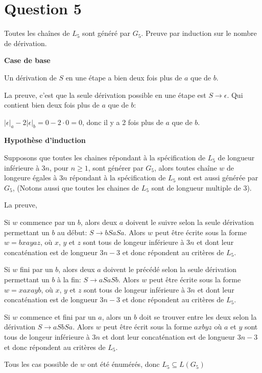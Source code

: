 \documentclass[class=article]{standalone}
\begin{document}
\section*{Question 5}

Toutes les chaînes de $L_5$ sont généré par $G_5$. Preuve par induction sur le nombre de dérivation.

{\bf Case de base}

Un dérivation de $S$ en une étape a bien deux fois plus de $a$ que de $b$. 

La preuve, c'est que la seule dérivation possible en une 
étape est $S \rightarrow \epsilon$. Qui contient bien deux fois 
plus de $a$ que de $b$: 

$|\epsilon|_a - 2|\epsilon|_b = 0 - 2\cdot0 = 0$,
donc il y a 2 fois plus de $a$ que de $b$.

{\bf Hypothèse d'induction}

Supposons que toutes les chaines répondant à la spécification de $L_5$
de longueur inférieure à $3n$, pour $n \geq 1$, sont générer par $G_5$,
alors toutes chaîne $w$ de longeure égales à $3n$ répondant à la spécification de $L_5$
sont est aussi générée par $G_5$, 
(Notons aussi que toutes les chaines de $L_5$ 
sont de longueur multiple de 3). 

La preuve, 

Si $w$ commence par un $b$, alors deux $a$ doivent 
le suivre selon la seule dérivation permettant un $b$ au début: $S \rightarrow bSaSa$.
Alors $w$ peut être écrite sous la forme 
$w = bxayaz$, où $x$, $y$ et $z$ 
sont tous de longeur inférieure à $3n$ et dont leur concaténation
est de longueur $3n-3$ 
et donc répondent au critères de $L_5$.


Si $w$ fini par un $b$, alors deux $a$ doivent 
le précédé selon la seule dérivation permettant un $b$ à la fin: $S \rightarrow aSaSb$.
Alors $w$ peut être écrite sous la forme 
$w = xaxayb$, où $x$, $y$ et $z$
sont tous de longeur inférieure à $3n$ et dont leur concaténation
est de longueur $3n-3$ et donc répondent au critères de $L_5$.

Si $w$ commence et fini par un $a$, alors un $b$ doit se trouver entre
les deux selon la dérivation $S \rightarrow aSbSa$.
Alors $w$ peut être écrit sous la forme
$axbyz$ où $a$ et $y$
sont tous de longeur inférieure à $3n$ et dont leur concaténation
est de longueur $3n-3$ et donc répondent au critères de $L_5$.

Tous les cas possible de $w$ ont été énumérés, donc $L_5 \subseteq L(G_5)$
\end{document}
